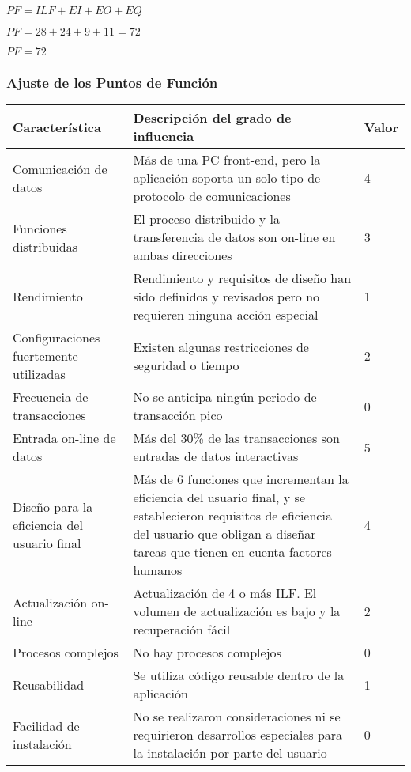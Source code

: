    $PF = ILF + EI + EO + EQ$
    
    $PF = 28 + 24 + 9 + 11 = 72$
    
    $PF = 72$
    
    \subsubsection{Ajuste de los Puntos de Función}
        
   \begin{table}[H]
   \centering
    \begin{tabular}{|p{4cm}|p{10cm}|l|}
        \hline
        Característica & Descripción del grado de influencia & Valor \\ \hline
        Comunicación de datos & Más de una PC front-end, pero la aplicación soporta un solo tipo de protocolo de comunicaciones & 4 \\ \hline
        Funciones distribuidas & El proceso distribuido y la transferencia de datos son on-line en ambas direcciones & 3 \\ \hline
        Rendimiento & Rendimiento y requisitos de diseño han sido definidos y revisados pero no requieren ninguna acción especial & 1 \\ \hline
        Configuraciones fuertemente utilizadas & Existen algunas restricciones de seguridad o tiempo & 2 \\ \hline
        Frecuencia de transacciones & No se anticipa ningún periodo de transacción pico & 0 \\ \hline
        Entrada on-line de datos & Más del 30\% de las transacciones son entradas de datos interactivas & 5 \\ \hline
        Diseño para la eficiencia del usuario final & Más de 6 funciones que incrementan la eficiencia del usuario final, y se establecieron requisitos de eficiencia del usuario que obligan a diseñar tareas que tienen en cuenta factores humanos & 4 \\ \hline
        Actualización on-line & Actualización de 4 o más ILF. El volumen de actualización es bajo y la recuperación fácil & 2 \\ \hline
        Procesos complejos & No hay procesos complejos & 0 \\ \hline
        Reusabilidad & Se utiliza código reusable dentro de la aplicación & 1 \\ \hline
        Facilidad de instalación & No se realizaron consideraciones ni se requirieron desarrollos especiales para la instalación por parte del usuario & 0 \\ \hline

\end{tabular}
\end{table}
